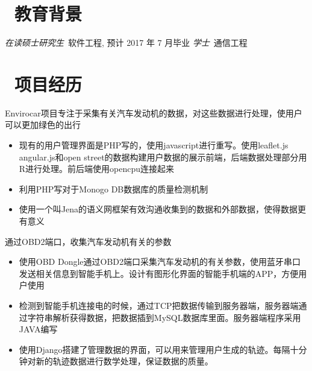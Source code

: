 \documentclass{resume}
\begin{document}


 
\section{\faGraduationCap\  教育背景}
\textit{在读硕士研究生}\ 软件工程, 预计 2017 年 7 月毕业
\textit{学士}\ 通信工程

\section{\faUsers\ 项目经历}
Envirocar项目专注于采集有关汽车发动机的数据，对这些数据进行处理，使用户可以更加绿色的出行
\begin{itemize}
  \item 现有的用户管理界面是PHP写的，使用javascript进行重写。使用leaflet.js angular.js和open street的数据构建用户数据的展示前端，后端数据处理部分用R进行处理。前后端使用opencpu连接起来
  \item 利用PHP写对于Monogo DB数据库的质量检测机制
  \item 使用一个叫Jena的语义网框架有效沟通收集到的数据和外部数据，使得数据更有意义
\end{itemize}

\begin{onehalfspacing}
通过OBD2端口，收集汽车发动机有关的参数
\begin{itemize}
  \item 使用OBD Dongle通过OBD2端口采集汽车发动机的有关参数，使用蓝牙串口发送相关信息到智能手机上。设计有图形化界面的智能手机端的APP，方便用户使用
  \item 检测到智能手机连接电的时候，通过TCP把数据传输到服务器端，服务器端通过字符串解析获得数据，把数据插到MySQL数据库里面。服务器端程序采用JAVA编写
  \item 使用Django搭建了管理数据的界面，可以用来管理用户生成的轨迹。每隔十分钟对新的轨迹数据进行数学处理，保证数据的质量。
\end{itemize}
\end{onehalfspacing}
\end{document}
